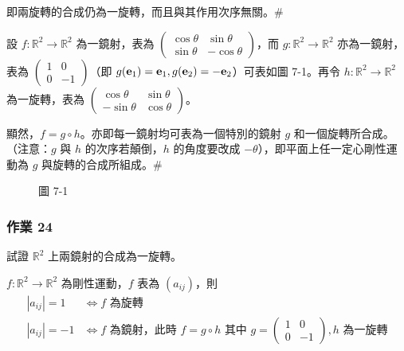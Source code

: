 即兩旋轉的合成仍為一旋轉，而且與其作用次序無關。\hfill$\#$

\begin{discussion}\label{disc:b6s-1-5}
設 $f: \mathbb{R}^2 \longrightarrow \mathbb{R}^2$ 為一鏡射，表為 $\begin{pmatrix} \cos\theta & \sin\theta \\ \sin\theta & -\cos\theta \end{pmatrix}$，而 $g: \mathbb{R}^2 \longrightarrow \mathbb{R}^2$ 亦為一鏡射，表為 $\begin{pmatrix} 1 & 0 \\ 0 & -1 \end{pmatrix}$（即 $g(\boldsymbol{\mathbf{e}}_1) = \boldsymbol{\mathbf{e}}_1, g(\boldsymbol{\mathbf{e}}_2) = -\boldsymbol{\mathbf{e}}_2$）可表如圖 7-1。再令 $h: \mathbb{R}^2 \longrightarrow \mathbb{R}^2$ 為一旋轉，表為 $\begin{pmatrix} \cos\theta & \sin\theta \\ -\sin\theta & \cos\theta \end{pmatrix}$。

顯然，$f = g \circ h$。亦即每一鏡射均可表為一個特別的鏡射 $g$ 和一個旋轉所合成。（注意：$g$ 與 $h$ 的次序若顛倒，$h$ 的角度要改成 $-\theta$），即平面上任一定心剛性運動為 $g$ 與旋轉的合成所組成。\hfill$\#$
\end{discussion}

\begin{figure}[H]
\centering
{}
\caption*{圖 7-1}\label{fig:b6s-7-1}
\end{figure}

\subsubsection*{作業 24}\label{hw:b6s-1-24}
試證 $\mathbb{R}^2$ 上兩鏡射的合成為一旋轉。

\begin{theorem}\label{thm:b6s-1-20}
$f: \mathbb{R}^2 \longrightarrow \mathbb{R}^2$ 為剛性運動，$f$ 表為 $(a_{ij})$，則
\begin{align*}
|a_{ij}| = 1 &\iff f \text{ 為旋轉} \\
|a_{ij}| = -1 &\iff f \text{ 為鏡射，此時 } f = g \circ h \text{ 其中 } g = \begin{pmatrix} 1 & 0 \\ 0 & -1 \end{pmatrix}, h \text{ 為一旋轉}
\end{align*}
\end{theorem}

